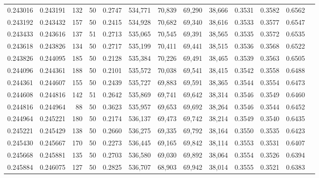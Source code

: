 \begin{tabular}{rrrrrrrrrrrrr}
0.243016 & 0.243191 &   132 &  50 &                                     0.2747 & 534,771 &  70,839 &  69,290 &  38,666 & 0.3531 & 0.3582 & 0.6562 \\
0.243192 & 0.243432 &   157 &  50 &                                     0.2415 & 534,928 &  70,682 &  69,340 &  38,616 & 0.3533 & 0.3577 & 0.6547 \\
0.243433 & 0.243616 &   137 &  51 &                                     0.2713 & 535,065 &  70,545 &  69,391 &  38,565 & 0.3535 & 0.3572 & 0.6535 \\
0.243618 & 0.243826 &   134 &  50 &                                     0.2717 & 535,199 &  70,411 &  69,441 &  38,515 & 0.3536 & 0.3568 & 0.6522 \\
0.243826 & 0.244095 &   185 &  50 &                                     0.2128 & 535,384 &  70,226 &  69,491 &  38,465 & 0.3539 & 0.3563 & 0.6505 \\
0.244096 & 0.244361 &   188 &  50 &                                     0.2101 & 535,572 &  70,038 &  69,541 &  38,415 & 0.3542 & 0.3558 & 0.6488 \\
0.244361 & 0.244607 &   155 &  50 &                                     0.2439 & 535,727 &  69,883 &  69,591 &  38,365 & 0.3544 & 0.3554 & 0.6473 \\
0.244608 & 0.244816 &   142 &  51 &                                     0.2642 & 535,869 &  69,741 &  69,642 &  38,314 & 0.3546 & 0.3549 & 0.6460 \\
0.244816 & 0.244964 &    88 &  50 &                                     0.3623 & 535,957 &  69,653 &  69,692 &  38,264 & 0.3546 & 0.3544 & 0.6452 \\
0.244964 & 0.245221 &   180 &  50 &                                     0.2174 & 536,137 &  69,473 &  69,742 &  38,214 & 0.3549 & 0.3540 & 0.6435 \\
0.245221 & 0.245429 &   138 &  50 &                                     0.2660 & 536,275 &  69,335 &  69,792 &  38,164 & 0.3550 & 0.3535 & 0.6423 \\
0.245430 & 0.245667 &   170 &  50 &                                     0.2273 & 536,445 &  69,165 &  69,842 &  38,114 & 0.3553 & 0.3531 & 0.6407 \\
0.245668 & 0.245881 &   135 &  50 &                                     0.2703 & 536,580 &  69,030 &  69,892 &  38,064 & 0.3554 & 0.3526 & 0.6394 \\
0.245884 & 0.246075 &   127 &  50 &                                     0.2825 & 536,707 &  68,903 &  69,942 &  38,014 & 0.3555 & 0.3521 & 0.6383 \\

\end{tabular}
